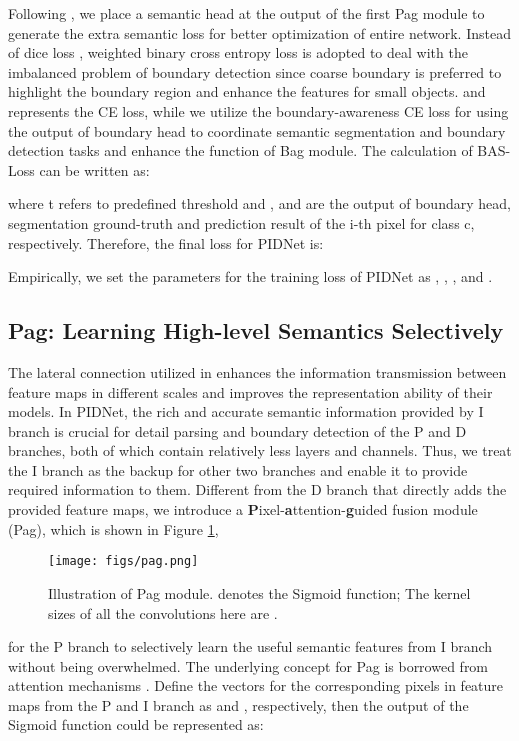 \documentclass[10pt,twocolumn,letterpaper]{article}
\begin{document}
Following \cite{bisenetv2, ddrnet, sfnet}, we place a semantic head at the output of the first Pag module to generate the extra semantic loss  for better optimization of entire network. Instead of dice loss \cite{crispy}, weighted binary cross entropy loss   is adopted to deal with the imbalanced problem of boundary detection since coarse boundary is preferred to highlight the boundary region and enhance the features for small objects.  and  represents the CE loss, while we utilize the boundary-awareness CE loss \cite{boundary-aware} for  using the output of boundary head to coordinate semantic segmentation and boundary detection tasks and enhance the function of Bag module. The calculation of BAS-Loss can be written as:

where t refers to predefined threshold and ,  and  are the output of boundary head, segmentation ground-truth and prediction result of the i-th pixel for class c, respectively. Therefore, the final loss for PIDNet is:

Empirically, we set the parameters for the training loss of PIDNet as , , ,  and .

\subsection{Pag: Learning High-level Semantics Selectively}
The lateral connection utilized in \cite{swiftnet, ddrnet, hrnet} enhances the information transmission between feature maps in different scales and improves the representation ability of their models. In PIDNet, the rich and accurate semantic information provided by I branch is crucial for detail parsing and boundary detection of the P and D branches, both of which contain relatively less layers and channels. Thus, we treat the I branch as the backup for other two branches and enable it to provide required information to them. Different from the D branch that directly adds the provided feature maps, we introduce a \textbf{P}ixel-\textbf{a}ttention-\textbf{g}uided fusion module (Pag), which is shown in Figure \ref{fig:pag}, 
\begin{figure}[h]
\centering
    \texttt{[image: figs/pag.png]}
\caption{Illustration of Pag module.  denotes the Sigmoid function; The kernel sizes of all the convolutions here are  .}
\label{fig:pag}
\end{figure}
for the P branch to selectively learn the useful semantic features from I branch without being overwhelmed.
The underlying concept for Pag is borrowed from attention mechanisms \cite{attention}. Define the vectors for the corresponding pixels in feature maps from the P and I branch as  and , respectively, then the output of the Sigmoid function could be represented as:
\end{document}
